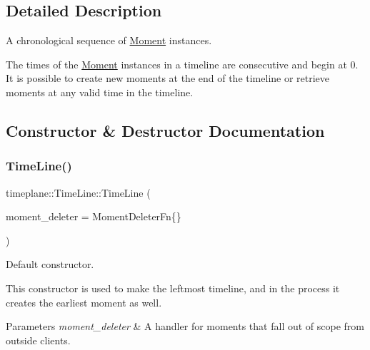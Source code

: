 \subsection{Detailed Description}
A chronological sequence of {\ttfamily \hyperlink{classtimeplane_1_1_moment}{Moment}} instances. 

The times of the {\ttfamily \hyperlink{classtimeplane_1_1_moment}{Moment}} instances in a timeline are consecutive and begin at 0. It is possible to create new moments at the end of the timeline or retrieve moments at any valid time in the timeline. 

\subsection{Constructor \& Destructor Documentation}
\mbox{\label{classtimeplane_1_1_time_line_a1f23d03d9ca5799fc641ffbc29a5f32d}} 
\subsubsection{\texorpdfstring{Time\+Line()}{TimeLine()}\hspace{0.1cm}{\footnotesize\ttfamily [1/2]}}
{\footnotesize\ttfamily timeplane\+::\+Time\+Line\+::\+Time\+Line (\begin{DoxyParamCaption}\item[{Moment\+Deleter\+Fn}]{moment\+\_\+deleter = {\ttfamily MomentDeleterFn\{\}} }\end{DoxyParamCaption})}



Default constructor. 

This constructor is used to make the leftmost timeline, and in the process it creates the earliest moment as well. 
\begin{DoxyParams}{Parameters}
{\em moment\+\_\+deleter} & A handler for moments that fall out of scope from outside clients. \\
\hline
\end{DoxyParams}
\mbox{\label{classtimeplane_1_1_time_line_a914a02e64e4bbc4bb4840012368c03f3}} 

